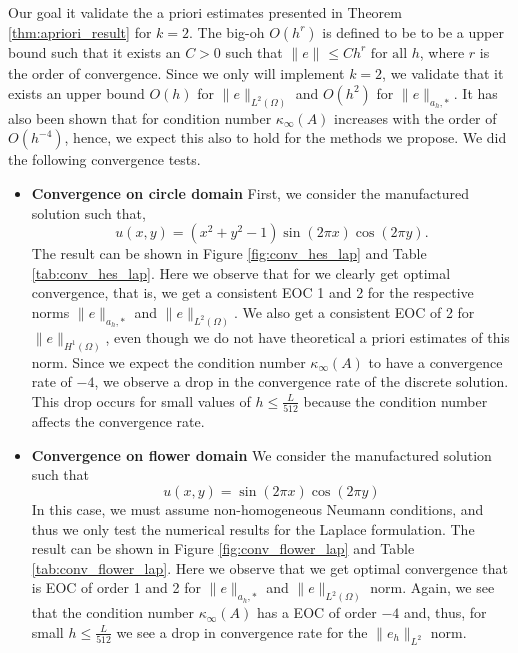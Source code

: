 \documentclass[11pt]{article}
\theoremstyle{remark}
\renewcommand{\le}{\leqslant}
\numberwithin{equation}{section}
\begin{document}
Our goal it validate the a priori estimates presented in Theorem \ref{thm:apriori_result} for $k= 2$.
The big-oh $O( h^{r})$ is defined to be to be a upper bound such that it exists an $C>0$ such that $\| e \|_{  }^{  } \le C h^{r} \text{ for all } h$, where $r$ is the order of convergence. Since we only will implement $k=2$, we validate that it exists an upper bound $ O( h)  $ for  $\| e \|_{L^{2}( \Omega )   }^{  }$  and $O( h^2)  $ for $\| e \|_{ a_{h},* }^{  } $.
It has also been shown that for condition number $\kappa_{\infty} ( A) $  increases with the order of $O( h^{-4}) $\cite{li07}, hence, we expect this also to hold for the methods we propose.
We did the following convergence tests.
\begin{itemize}
    \item \textbf{Convergence on circle domain}
        First, we consider the manufactured solution such that,
        \begin{equation}
        \label{eq:man_sol_1}
            u(x,y) = (x^2+ y^2 -1) \sin\left(2 \pi x \right)\cos\left(2\pi y\right).
        \end{equation}
        The result can be shown in Figure \ref{fig:conv_hes_lap} and Table \ref{tab:conv_hes_lap}. Here we observe that for we clearly get optimal convergence, that is, we get a consistent EOC 1 and 2 for the respective norms $\| e  \|_{a_{h},*  }^{  } $
        and $\| e  \|_{L^2( \Omega )   }^{  } $.  We also get a consistent EOC of 2 for $\| e \|_{ H^{1}(\Omega  )  }^{  } $, even though we do not have theoretical a priori estimates of this norm.    Since we expect the condition number $\kappa_{\infty}(A)$ to have a convergence rate of $-4$, we observe a drop in the convergence rate of the discrete solution.
This drop occurs for small values of $h \leq \frac{L}{512}$ because the condition number affects the convergence rate.

    \item \textbf{Convergence on flower domain}
        We consider the manufactured solution such that
        \begin{equation}
        \label{eq:man_sol_2}
            u(x,y) =  \sin\left( 2\pi x \right)\cos\left(2\pi y\right)
        \end{equation}
        In this case, we must assume non-homogeneous Neumann conditions, and thus we only test the numerical results for the Laplace formulation. The result can be shown in Figure \ref{fig:conv_flower_lap} and Table \ref{tab:conv_flower_lap}. Here we
        observe that we get optimal convergence that is EOC of order 1 and 2 for $\| e  \|_{a_{h},*  }^{  } $ and  $ \| e  \|_{L^{2}( \Omega )   }^{  } $ norm. Again, we see that the condition number $\kappa _{\infty}( A)  $ has a EOC of order
        $-4$ and, thus, for small $h\le \frac{L}{512}$ we see a drop in convergence rate for the $\| e_{h} \|_{ L^{2} }^{  } $ norm.
\end{itemize}
\end{document}
